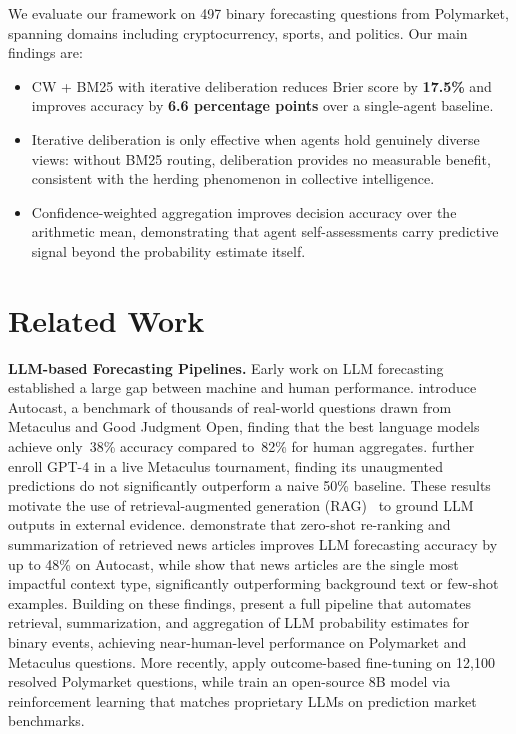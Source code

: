 \documentclass[11pt]{article}
\theoremstyle{definition}          %
\begin{document}
We evaluate our framework on 497 binary forecasting questions from Polymarket,
spanning domains including cryptocurrency, sports, and politics.
Our main findings are:
\begin{itemize}
  \item CW + BM25 with iterative deliberation reduces Brier score by \textbf{17.5\%}
    and improves accuracy by \textbf{6.6 percentage points} over a single-agent baseline.
  \item Iterative deliberation is only effective when agents hold genuinely diverse views:
    without BM25 routing, deliberation provides no measurable benefit, consistent with
    the herding phenomenon in collective intelligence.
  \item Confidence-weighted aggregation improves decision accuracy over the arithmetic
    mean, demonstrating that agent self-assessments carry predictive signal beyond the
    probability estimate itself.
\end{itemize}


\section{Related Work}

\textbf{LLM-based Forecasting Pipelines.}
Early work on LLM forecasting established a large gap between machine and human performance.
\citet{zou2022forecasting} introduce Autocast, a benchmark of thousands of real-world questions drawn from Metaculus and Good Judgment Open, finding that the best language models achieve only~38\% accuracy compared to~82\% for human aggregates.
\citet{schoenegger2023large} further enroll GPT-4 in a live Metaculus tournament, finding its unaugmented predictions do not significantly outperform a naive 50\% baseline.
These results motivate the use of retrieval-augmented generation (RAG)~\citep{lewis2020retrieval,guu2020retrieval} to ground LLM outputs in external evidence.
\citet{yanautocast++} demonstrate that zero-shot re-ranking and summarization of retrieved news articles improves LLM forecasting accuracy by up to 48\% on Autocast, while \citet{piryani2025s} show that news articles are the single most impactful context type, significantly outperforming background text or few-shot examples.
Building on these findings, \citet{halawi2024approaching} present a full pipeline that automates retrieval, summarization, and aggregation of LLM probability estimates for binary events, achieving near-human-level performance on Polymarket and Metaculus questions.
More recently, \citet{turtel2025llms} apply outcome-based fine-tuning on 12,100 resolved Polymarket questions, while \citet{chandakscaling} train an open-source 8B model via reinforcement learning that matches proprietary LLMs on prediction market benchmarks.
\end{document}

